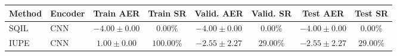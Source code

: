 \begin{table}[ht]
\centering
\scriptsize
\begin{tabular*}{\textwidth}{@{\extracolsep{\fill}}llcccccc}
\toprule
Method & Encoder & Train AER & Train SR & Valid. AER & Valid. SR & Test AER & Test SR \\
\midrule
SQIL & CNN & $-4.00 \pm 0.00$ & $0.00\%$ & $-4.00 \pm 0.00$ & $0.00\%$ & $-4.00 \pm 0.00$ & $0.00\%$ \\
\midrule
IUPE & CNN & $1.00 \pm 0.00$ & $100.00\%$ & $-2.55 \pm 2.27$ & $29.00\%$ & $-2.55 \pm 2.27$ & $29.00\%$ \\
\bottomrule
\end{tabular*}
\end{table}
